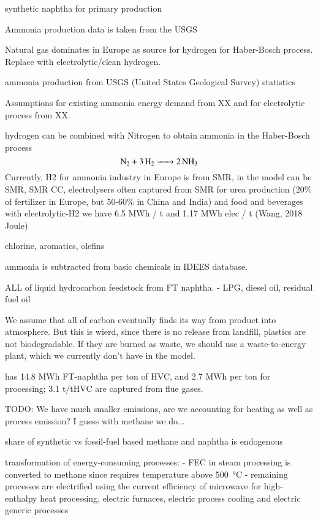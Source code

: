 
synthetic naphtha for primary production

Ammonia production data is taken from the USGS

Natural gas dominates in Europe as source for hydrogen for Haber-Bosch process.
Replace with electrolytic/clean hydrogen.


ammonia production from USGS (United States Geological Survey) statistics

Assumptions for existing ammonia energy demand from XX and for electrolytic
process from XX.

hydrogen can be combined with Nitrogen to obtain ammonia in the Haber-Bosch process 
\begin{equation}
    \ce{N2 + 3H2 -> 2NH3}
\end{equation}
Currently, H2 for ammonia industry in Europe is from SMR, in the model can be SMR, SMR CC, electrolysers
\co often captured from SMR for urea production (20\% of fertilizer in Europe,
but 50-60\% in China and India) and food and beverages
with electrolytic-H2 we have 6.5 MWh  / t  and 1.17 MWh elec / t  (Wang, 2018 Joule)

chlorine, aromatics, olefins

ammonia is subtracted from basic chemicals in IDEES database.


ALL of liquid hydrocarbon feedstock from FT naphtha.
- LPG, diesel oil, residual fuel oil

We assume that all of carbon eventually finds its way from product into
atmosphere. But this is wierd, since there is no release from landfill, plastics
are not biodegradable. If they are burned as waste, we should use a
waste-to-energy plant, which we currently don't have in the model.

 has 14.8 MWh FT-naphtha per ton of HVC, and 2.7 MWh per
ton for processing; 3.1 t\co/tHVC are captured from flue gases.

TODO: We have much smaller emissions, are we accounting for heating as well as
process emission? I guess with methane we do...

share of synthetic vs fossil-fuel based methane and naphtha is endogenous

transformation of energy-consuming processes:
- FEC in steam processing is converted to methane since requires temperature above \SI{500}{\celsius} 
- remaining processes are electrified using the current efficiency  of microwave for high-enthalpy heat processing,
  electric furnaces, electric process cooling and electric generic processes

